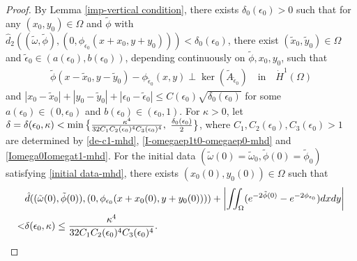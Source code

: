 \documentclass[1 [leqno, 11pt]{amsart}
\numberwithin{equation}{section}
\let\ep=\epsilon
\newtheorem{Theorem}{Theorem}[section]
\begin{document}
\begin{CJK*}{GBK}{song}
\begin{proof}By Lemma \ref{imp-vertical condition},  there exists $\delta_0(\ep_0)>0$ such that for any  $(x_0,y_0)\in\Omega$ and  $\tilde \phi$ with $\hat d_2((\tilde \omega,\tilde \phi),(0,\phi_{\ep_0}(x+x_0,y+y_0)))< \delta_0(\ep_0)$, there exist $(\tilde x_0,\tilde y_0)\in\Omega$ and $\tilde\epsilon_0\in(a(\ep_0),b(\ep_0))$, depending continuously on $\tilde\phi, x_0, y_0$, such that
\begin{align}\label{app-lemma-imp-vertical condition-mhd}
\tilde \phi\left(x-\tilde x_0,y-\tilde y_0\right)-\phi_{\tilde\ep_0}(x,y)\perp\ker \left( \tilde A_{\tilde\ep_0}\right)\quad \text{in}\quad \dot{H}^1(\Omega)
\end{align}
 and
$
|x_0-\tilde x_0|+|y_0-\tilde y_0|+|\ep_0-\tilde \ep_0|\leq C(\ep_0)\sqrt{\delta_0(\ep_0)}
$
for some $a(\ep_0)\in (0,\ep_0)$ and $b(\ep_0)\in(\ep_0,1)$.
For  $\kappa>0$, let $\delta=\delta(\ep_0,\kappa)<\min\big\{{\kappa^4\over32C_1C_2(\ep_0)^4C_3(\ep_0)^4},$ ${\delta_0(\ep_0)\over2}\big\}$, where $C_1, C_2(\ep_0), C_3(\ep_0)>1$ are  determined by \eqref{de-c1-mhd}, \eqref{I-omegaep1t0-omegaep0-mhd} and \eqref{Iomega0Iomegat1-mhd}.
For the initial data $(\tilde \omega(0)=\tilde \omega_0,\tilde \phi(0)=\tilde \phi_0)$ satisfying
\eqref{initial data-mhd},
there exists $(x_0(0),y_0(0))\in\Omega$  such that
\begin{align}\nonumber
&\hat d((\tilde\omega(0),\tilde \phi(0)),(0,\phi_{\ep_0}(x+x_0(0),y+y_0(0))))+\left|\iint_{\Omega}(e^{-2\tilde \phi(0)}-e^{-2\phi_{\ep_0}})dxdy\right|\\\label{initial data-translation-infimum}
<&\delta(\ep_0,\kappa)\leq {\kappa^4\over32C_1C_2(\ep_0)^4C_3(\ep_0)^4}.
\end{align}


\end{proof}
\end{CJK*}
\end{document}
